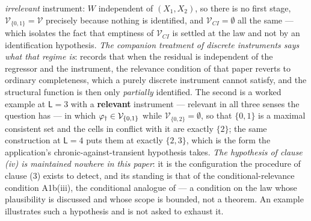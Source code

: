 \begin{remark}
\begin{enumerate}
\emph{irrelevant} instrument: $W$ independent of $(X_1,X_2)$, so there is no first stage,
$\mathcal V_{\{0,1\}}=\mathcal V$ precisely because nothing is identified, and
$\mathcal V_{CI}=\emptyset$ all the same --- which isolates the fact that emptiness of
$\mathcal V_{CI}$ is settled at the law and not by an identification hypothesis.
\emph{The companion treatment of discrete instruments says what that regime is}:
\citet[Remark~2]{centorrinofeveflorens2019} records that when the residual is independent of the
regressor and the instrument, the relevance condition of that paper reverts to ordinary completeness,
which a purely discrete instrument cannot satisfy, and the structural function is then only
\emph{partially} identified. The second is a worked example at $\mathsf L=3$ with a \textbf{relevant}
instrument --- relevant in all three senses the question has --- in which
$\varphi_{\dagger}\in\mathcal V_{\{0,1\}}$ while $\mathcal V_{\{0,2\}}=\emptyset$, so that $\{0,1\}$ is a maximal
consistent set and the cells in conflict with it are exactly $\{2\}$; the same construction at
$\mathsf L=4$ puts them at exactly $\{2,3\}$, which is the form the application's
chronic-against-transient hypothesis takes. \emph{The hypothesis of clause \textup{(iv)} is maintained
nowhere in this paper}: it is the configuration the procedure of clause \textup{(3)} exists to detect,
and its standing is that of the conditional-relevance condition A1b(iii), the conditional analogue of
\citet[Assumption~2.2]{centorrinofeveflorens2019} --- a condition on the law whose plausibility is
discussed and whose scope is bounded, not a theorem. An example illustrates such a hypothesis and is
not asked to exhaust it.
\end{enumerate}
\end{remark}

